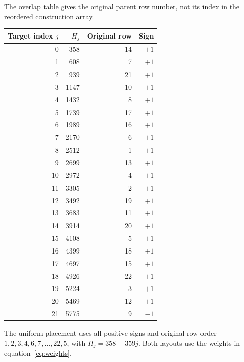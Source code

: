 The overlap table gives the original parent row number, not its index in the reordered construction array.
\begin{center}
\begin{tabular}{@{}rrrr@{}}
\toprule Target index $j$ & $H_j$ & Original row & Sign\\\midrule
0 & 358 & 14 & $+1$\\
1 & 608 & 7 & $+1$\\
2 & 939 & 21 & $+1$\\
3 & 1147 & 10 & $+1$\\
4 & 1432 & 8 & $+1$\\
5 & 1739 & 17 & $+1$\\
6 & 1989 & 16 & $+1$\\
7 & 2170 & 6 & $+1$\\
8 & 2512 & 1 & $+1$\\
9 & 2699 & 13 & $+1$\\
10 & 2972 & 4 & $+1$\\
11 & 3305 & 2 & $+1$\\
12 & 3492 & 19 & $+1$\\
13 & 3683 & 11 & $+1$\\
14 & 3914 & 20 & $+1$\\
15 & 4108 & 5 & $+1$\\
16 & 4399 & 18 & $+1$\\
17 & 4697 & 15 & $+1$\\
18 & 4926 & 22 & $+1$\\
19 & 5224 & 3 & $+1$\\
20 & 5469 & 12 & $+1$\\
21 & 5775 & 9 & $-1$\\
\bottomrule
\end{tabular}
\end{center}
The uniform placement uses all positive signs and original row order $1,2,3,4,6,7,\ldots,22,5$, with $H_j=358+359j$. Both layouts use the weights in equation~\eqref{eq:weights}.
